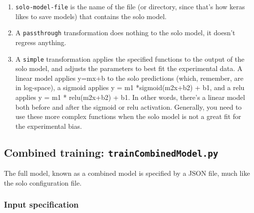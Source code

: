 \documentclass{article}
\begin{document}
\begin{enumerate}
    \item \texttt{solo-model-file} is the name of the file (or directory, since that's how keras likes to save models) that contains the solo model.
    \item A \texttt{passthrough} transformation does nothing to the solo model, it doesn't regress anything.
    \item A \texttt{simple} transformation applies the specified functions to the output of the solo model, and adjusts the parameters to best fit the experimental data.
        A linear model applies y=mx+b to the solo predictions (which, remember, are in log-space), a sigmoid applies y = m1 *sigmoid(m2x+b2) + b1, and a relu applies y = m1 * relu(m2x+b2) + b1.
        In other words, there's a linear model both before and after the sigmoid or relu activation.
        Generally, you need to use these more complex functions when the solo model is not a great fit for the experimental bias.
\end{enumerate}



\newpage

\subsection{Combined training: \texttt{trainCombinedModel.py}}

The full model, known as a combined model is specified by a JSON file, much like the solo configuration file.

\subsubsection{Input specification}
\end{document}
